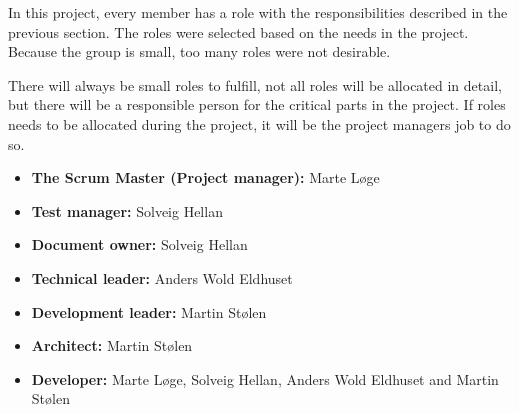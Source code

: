 In this project, every member has a role with the responsibilities described in the previous section.
The roles were selected based on the needs in the project. Because the group is small, too many roles were not desirable.

There will always be small roles to fulfill, not all roles will be allocated in detail, but there will be a responsible person for the critical parts in the project. If roles needs to be allocated during the project, it will be the project managers job to do so.

\begin{itemize}
  \item {\bf The Scrum Master (Project manager):} Marte Løge
  \item {\bf Test manager:} Solveig Hellan
  \item {\bf Document owner:} Solveig Hellan
  \item {\bf Technical leader:} Anders Wold Eldhuset
  \item {\bf Development leader:} Martin Stølen
  \item {\bf Architect:} Martin Stølen
  \item {\bf Developer:} Marte Løge, Solveig Hellan, Anders Wold Eldhuset and Martin Stølen
\end{itemize}





